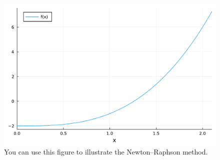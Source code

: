 \documentclass[10pt]{article}
\theoremstyle{definition}
\theoremstyle{remark}
\theoremstyle{plain}%
\begin{document}
\begin{figure}[ht]
    \centering
    \includegraphics[width=\linewidth]{newton-raphson.pdf}
    \caption{You can use this figure to illustrate the Newton--Raphson method.}%
    \label{fig:nr}
\end{figure}
\end{document}
